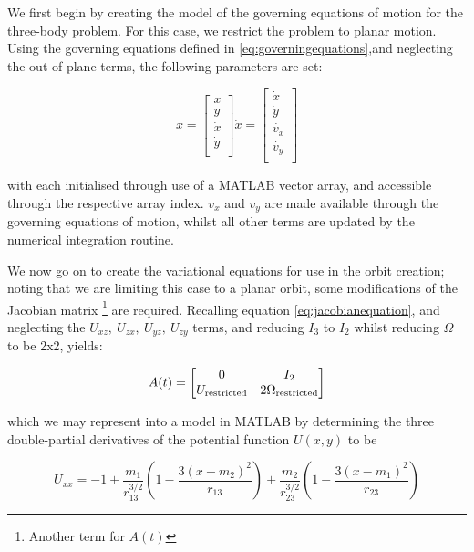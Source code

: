 We first begin by creating the model of the governing equations of motion for the three-body problem. For this case, we restrict the problem to planar motion. Using the governing equations defined in \ref{eq:governingequations},and neglecting the out-of-plane terms, the following parameters are set:

\begin{equation}
	x = 
	\begin{bmatrix}
		x\\
		y\\
		\dot{x}\\
		\dot{y}\\
	\end{bmatrix}
	\dot{x} = 
	\begin{bmatrix}
		\dot{x}\\
		\dot{y}\\
		\dot{v_x}\\
		\dot{v_y}\\
	\end{bmatrix}
\end{equation}

with each initialised through use of a MATLAB vector array, and accessible through the respective array index. $v_x$ and $v_y$ are made available through the governing equations of motion, whilst all other terms are updated by the numerical integration routine.

We now go on to create the variational equations for use in the orbit creation; noting that we are limiting this case to a planar orbit, some modifications of the Jacobian matrix \footnote{Another term for $A(t)$} are required. Recalling equation \ref{eq:jacobianequation}, and neglecting the $U_{xz},~U_{zx},~U_{yz},~U_{zy}$ terms, and reducing $I_3$ to $I_2$ whilst reducing $\Omega$ to be 2x2, yields:

\begin{equation}
	A(t) =
	\begin{bmatrix}
		0 & I_2 \\
		U_{\textnormal{restricted}} & 2\Omega_{\textnormal{restricted}} \\
	\end{bmatrix}
\end{equation}

which we may represent into a model in MATLAB by determining the three double-partial derivatives of the potential function $U(x, y)$ to be 

\begin{equation}
	U_{xx} = -1+\frac{m_1}{r_{13}^{3/2}} \left( 1 - \frac{3(x+m_2)^2}{r_{13}} \right) + \frac{m_2}{r_{23}^{3/2}}\left(1 - \frac{3(x-m_1)^2}{r_{23}}\right)
\end{equation}

